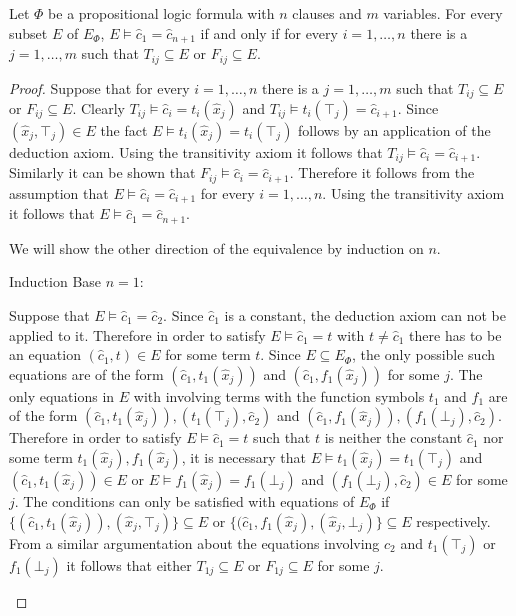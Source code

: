 \begin{lemma}
\label{lemma:charexpl}

Let $\Phi$ be a propositional logic formula with $n$ clauses and $m$ variables.
For every subset $E$ of $E_{\Phi}$, $E \models \hat{c}_1 = \hat{c}_{n+1}$ if and only if for every $i = 1,\ldots,n$ there is a $j = 1,\ldots,m$ such that $T_{ij} \subseteq E$ or $F_{ij} \subseteq E$.

\end{lemma}

\begin{proof}

Suppose that for every $i = 1,\ldots,n$ there is a $j = 1,\ldots,m$ such that $T_{ij} \subseteq E$ or $F_{ij} \subseteq E$.
Clearly $T_{ij} \models \hat{c}_i = t_i(\hat{x}_j)$ and $T_{ij} \models t_i(\top_j) = \hat{c}_{i+1}$. 
Since $(\hat{x}_j,\top_j) \in E$ the fact $E \models t_i(\hat{x}_j) = t_i(\top_j)$ follows by an application of the deduction axiom.
Using the transitivity axiom it follows that $T_{ij} \models \hat{c}_i = \hat{c}_{i+1}$.
Similarly it can be shown that $F_{ij} \models \hat{c}_i = \hat{c}_{i+1}$.
Therefore it follows from the assumption that $E \models \hat{c}_i = \hat{c}_{i+1}$ for every $i = 1,\ldots,n$.
Using the transitivity axiom it follows that $E \models \hat{c}_1 = \hat{c}_{n+1}$.


\noindent We will show the other direction of the equivalence by induction on $n$.
\begin{paragraph}{Induction Base $n = 1$:}

Suppose that $E \models \hat{c}_1 = \hat{c}_{2}$. %
Since $\hat{c}_1$ is a constant, the deduction axiom can not be applied to it.
Therefore in order to satisfy $E \models \hat{c}_1 = t$ with $t \neq \hat{c}_1$ there has to be an equation $(\hat{c}_1, t) \in E$ for some term $t$.
Since $E \subseteq E_{\Phi}$, the only possible such equations are of the form $(\hat{c}_1, t_1(\hat{x}_j))$ and $(\hat{c}_1, f_1(\hat{x}_j))$ for some $j$.
The only equations in $E$ with involving terms with the function symbols $t_1$ and $f_1$ are of the form $(\hat{c}_1, t_1(\hat{x}_j)), (t_1(\top_j),\hat{c}_2)$ and $(\hat{c}_1, f_1(\hat{x}_j)), (f_1(\bot_j),\hat{c}_2)$.
Therefore in order to satisfy $E \models \hat{c}_1 = t$ such that $t$ is neither the constant $\hat{c}_1$ nor some term $t_1(\hat{x}_j), f_1(\hat{x}_j)$, it is necessary that $E \models t_1(\hat{x}_j) = t_1(\top_j)$ and $(\hat{c}_1, t_1(\hat{x}_j)) \in E$ or $E \models f_1(\hat{x}_j) = f_1(\bot_j)$ and $(f_1(\bot_j),\hat{c}_2) \in E$ for some $j$.
The conditions can only be satisfied with equations of $E_{\Phi}$ if $\{(\hat{c}_1, t_1(\hat{x}_j)), (\hat{x}_j,\top_j)\} \subseteq E$ or $\{(\hat{c}_1, f_1(\hat{x}_j), (\hat{x}_j,\bot_j)\} \subseteq E$ respectively.
From a similar argumentation about the equations involving $c_2$ and $t_1(\top_j)$ or $f_1(\bot_j)$ it follows that either $T_{1j} \subseteq E$ or $F_{1j} \subseteq E$ for some $j$.
\end{paragraph}


\end{proof}
